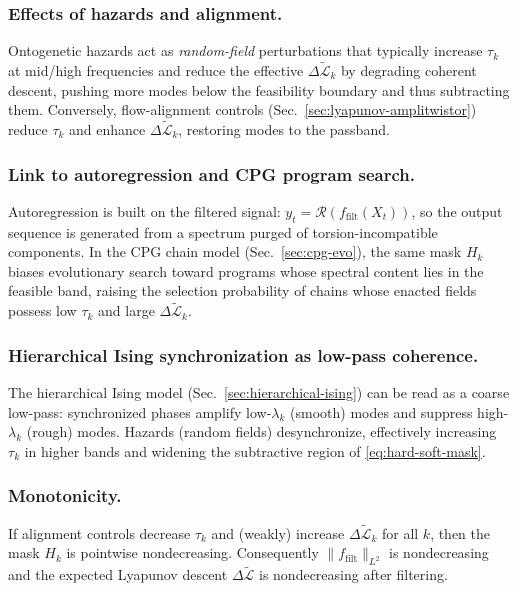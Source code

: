 \documentclass[a4paper,11pt]{article}
\begin{document}
\subsubsection{Effects of hazards and alignment.}
Ontogenetic hazards act as \emph{random-field} perturbations that typically
increase $\tau_k$ at mid/high frequencies and reduce the effective
$\Delta\widetilde{\mathcal{L}}_k$ by degrading coherent descent, pushing more
modes below the feasibility boundary and thus subtracting them. Conversely,
flow-alignment controls (Sec.~\ref{sec:lyapunov-amplitwistor}) reduce $\tau_k$
and enhance $\Delta\widetilde{\mathcal{L}}_k$, restoring modes to the passband.

\subsubsection{Link to autoregression and CPG program search.}
Autoregression is built on the filtered signal: $y_t=\mathcal{R}(f_{\mathrm{filt}}(X_t))$,
so the output sequence is generated from a spectrum purged of torsion-incompatible
components. In the CPG chain model (Sec.~\ref{sec:cpg-evo}), the same mask
$H_k$ biases evolutionary search toward programs whose spectral content lies in
the feasible band, raising the selection probability of chains whose enacted
fields possess low $\tau_k$ and large $\Delta\widetilde{\mathcal{L}}_k$.

\subsubsection{Hierarchical Ising synchronization as low-pass coherence.}
The hierarchical Ising model (Sec.~\ref{sec:hierarchical-ising}) can be read as
a coarse low-pass: synchronized phases amplify low-$\lambda_k$ (smooth) modes
and suppress high-$\lambda_k$ (rough) modes. Hazards (random fields) desynchronize,
effectively increasing $\tau_k$ in higher bands and widening the subtractive
region of \eqref{eq:hard-soft-mask}.

\subsubsection{Monotonicity.}
\begin{proposition}
If alignment controls decrease $\tau_k$ and (weakly) increase
$\Delta\widetilde{\mathcal{L}}_k$ for all $k$, then the mask $H_k$ is pointwise
nondecreasing. Consequently $\|f_{\mathrm{filt}}\|_{L^2}$ is nondecreasing and
the expected Lyapunov descent $\Delta\widetilde{\mathcal{L}}$ is nondecreasing
after filtering.
\end{proposition}
\end{document}
